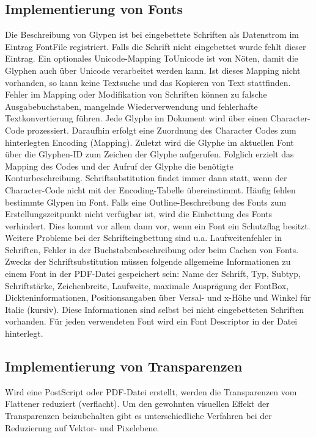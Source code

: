 \subsection{Implementierung von Fonts}
Die Beschreibung von Glypen ist bei eingebettete Schriften als Datenstrom im Eintrag FontFile registriert. Falls die Schrift nicht eingebettet wurde fehlt dieser Eintrag. Ein optionales Unicode-Mapping ToUnicode ist von Nöten, damit die Glyphen auch über Unicode verarbeitet werden kann. Ist dieses Mapping nicht vorhanden, so kann keine Textsuche und das Kopieren von Text stattfinden. Fehler im Mapping oder Modifikation von Schriften können zu falsche Ausgabebuchstaben, mangelnde Wiederverwendung und fehlerhafte Textkonvertierung führen. Jede Glyphe im Dokument wird über einen Character-Code prozessiert. Daraufhin erfolgt eine Zuordnung des Character Codes zum hinterlegten Encoding (Mapping). Zuletzt wird die Glyphe im aktuellen Font über die Glyphen-ID zum Zeichen der Glyphe aufgerufen. Folglich erzielt das Mapping des Codes und der Aufruf der Glyphe die benötigte Konturbeschreibung. Schriftsubstitution findet immer dann statt, wenn der Character-Code nicht mit der Encoding-Tabelle übereinstimmt. Häufig fehlen bestimmte Glypen im Font. Falls eine Outline-Beschreibung des Fonts zum Erstellungszeitpunkt nicht verfügbar ist, wird die Einbettung des Fonts verhindert. Dies kommt vor allem dann vor, wenn ein Font ein Schutzflag besitzt. Weitere Probleme bei der Schrifteingbettung sind u.a. Laufweitenfehler in Schriften, Fehler in der Buchstabenbeschreibung oder beim Cachen von Fonts. Zwecks der Schriftsubstitution müssen folgende allgemeine Informationen zu einem Font in der PDF-Datei gespeichert sein: Name der Schrift, Typ, Subtyp, Schriftstärke, Zeichenbreite, Laufweite, maximale Ausprägung der FontBox, Dickteninformationen, Positionsangaben über Versal- und x-Höhe und Winkel für Italic (kursiv). Diese Informationen sind selbst bei nicht eingebetteten Schriften vorhanden. Für jeden verwendeten Font wird ein Font Descriptor in der Datei hinterlegt. \cite{schneeberger} 

\subsection{Implementierung von Transparenzen}
Wird eine PostScript oder PDF-Datei erstellt, werden die Transparenzen vom Flattener reduziert (verflacht). Um den gewohnten visuellen Effekt der Transparenzen beizubehalten gibt es unterschiedliche Verfahren bei der Reduzierung auf Vektor- und Pixelebene. 